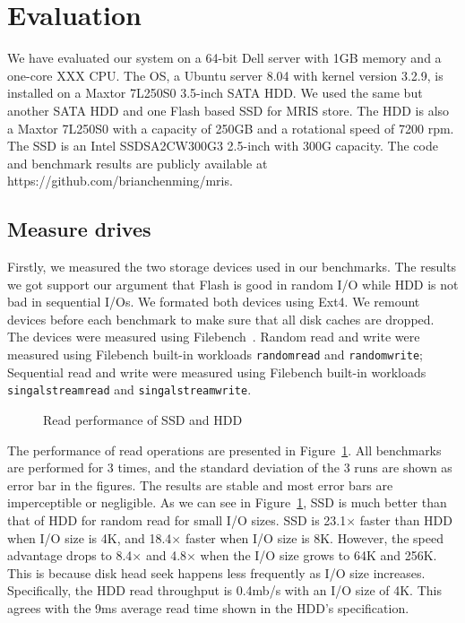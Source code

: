 \section{Evaluation} \label{sec:eval}

We have evaluated our system on a 64-bit Dell server with 1GB memory
and a one-core XXX CPU. The OS, a Ubuntu server 8.04 with kernel
version 3.2.9, is installed on a Maxtor 7L250S0 3.5-inch SATA HDD. We
used the same but another SATA HDD and one Flash based SSD for MRIS
store. The HDD is also a Maxtor 7L250S0 with a capacity of 250GB and a
rotational speed of 7200 rpm.  The SSD is an Intel SSDSA2CW300G3
2.5-inch with 300G capacity.  The code and benchmark results are
publicly available at https://github.com/brianchenming/mris.

\subsection{Measure drives}
\label{sec:drives}

Firstly, we measured the two storage devices used in our benchmarks.
The results we got support our argument that Flash is good in random
I/O while HDD is not bad in sequential I/Os. We formated both devices
using Ext4. We remount devices before each benchmark to make sure that
all disk caches are dropped. The devices were measured using
Filebench~\cite{filebench-web}. Random read and write were measured
using Filebench built-in workloads \texttt{randomread} and
\texttt{randomwrite}; Sequential read and write were measured using
Filebench built-in workloads \texttt{singalstreamread} and
\texttt{singalstreamwrite}.

\begin{figure}[t]
\begin{centering}
\caption{Read performance of SSD and HDD}
\label{fig:driveread}
\end{centering}
\end{figure}

The performance of read operations are presented in
Figure~\ref{fig:driveread}. All benchmarks are performed for 3 times,
and the standard deviation of the 3 runs are shown as error bar in the
figures. The results are stable and most error bars are imperceptible
or negligible. As we can see in Figure~\ref{fig:driveread}, SSD is
much better than that of HDD for random read for small I/O sizes. SSD
is 23.1$\times$ faster than HDD when I/O size is 4K, and 18.4$\times$
faster when I/O size is 8K. However, the speed advantage drops to
8.4$\times$ and 4.8$\times$ when the I/O size grows to 64K and 256K.
This is because disk head seek happens less frequently as I/O size
increases. Specifically, the HDD read throughput is 0.4mb/s with an
I/O size of 4K. This agrees with the 9ms average read time shown in
the HDD's specification.  

